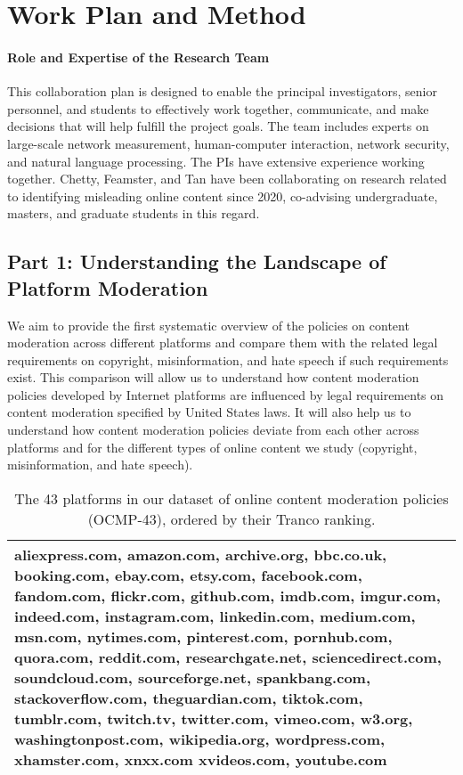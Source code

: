 \section{Work Plan and Method}
\label{sec:work-plan}

\paragraph{Role and Expertise of the Research Team} This collaboration plan is
designed to enable the principal investigators, senior personnel, and students
to effectively work together, communicate, and make decisions that will help
fulfill the project goals. The team includes experts on large-scale network
measurement, human-computer interaction, network security, and natural
language processing. The PIs have extensive experience working
together. Chetty, Feamster, and Tan have been collaborating on research
related to identifying misleading online content since 2020, co-advising
undergraduate, masters, and graduate students in this regard.


\subsection{Part 1: Understanding the Landscape of Platform Moderation}
\label{sec:landscape}

We aim to provide the first systematic overview
of the policies on content moderation across different platforms and compare
them with the related legal requirements on copyright, misinformation, and hate speech if such requirements exist.
This comparison will allow us to understand how content moderation policies
developed by Internet platforms are influenced by legal requirements on
content moderation specified by United States laws. It will also help us to
understand how content moderation policies deviate from each other across
platforms and for the different types of online content we study (copyright,
misinformation, and hate speech).


\begin{table}[t]
    \begin{scriptsize}
    \begin{tabular}{|p{6in}|}
\hline
aliexpress.com, 
amazon.com, 
archive.org,
bbc.co.uk, 
booking.com,
ebay.com, 
etsy.com, 
facebook.com, 
fandom.com, 
flickr.com,
github.com, 
imdb.com, 
imgur.com, 
indeed.com, 
instagram.com,
linkedin.com, 
medium.com, 
msn.com, 
nytimes.com, 
pinterest.com,
pornhub.com, 
quora.com, 
reddit.com, 
researchgate.net, 
sciencedirect.com, 
soundcloud.com,
sourceforge.net, 
spankbang.com, 
stackoverflow.com, 
theguardian.com, 
tiktok.com,
tumblr.com, 
twitch.tv, 
twitter.com, 
vimeo.com, 
w3.org,
washingtonpost.com,
wikipedia.org, 
wordpress.com, 
xhamster.com, 
xnxx.com 
xvideos.com, 
youtube.com
\\ \hline
\end{tabular}
    \end{scriptsize}
\caption{The 43 platforms in our dataset of online content moderation policies (OCMP-43), ordered by their Tranco ranking.}
\label{tab:platformlist}
\end{table}

